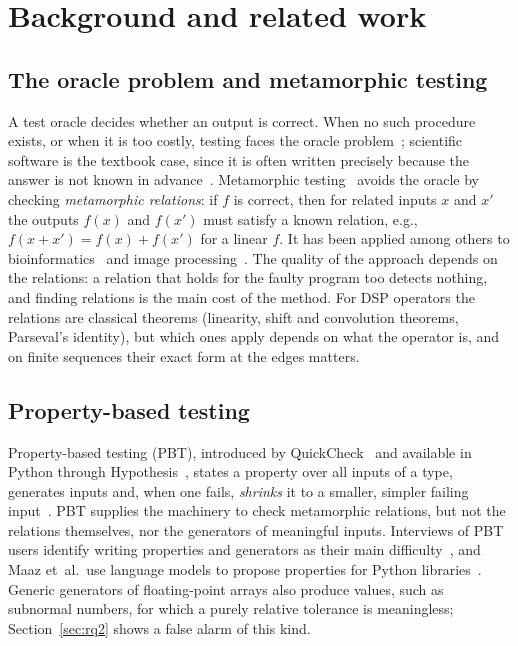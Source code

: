 \documentclass[10pt,conference]{IEEEtran}
\newcommand{\eg}{e.g.,\ }
\begin{document}
\section{Background and related work}
\label{sec:related}

\subsection{The oracle problem and metamorphic testing}
A test oracle decides whether an output is correct. When no such procedure
exists, or when it is too costly, testing faces the oracle
problem~\cite{barr2015oracle}; scientific software is the textbook case, since
it is often written precisely because the answer is not known in
advance~\cite{kanewala2014scientific}. Metamorphic
testing~\cite{chen2018metamorphic,segura2016metamorphic} avoids the oracle by
checking \emph{metamorphic relations}: if $f$ is correct, then for related
inputs $x$ and $x'$ the outputs $f(x)$ and $f(x')$ must satisfy a known
relation, \eg $f(x+x') = f(x)+f(x')$ for a linear $f$. It has been applied
among others to bioinformatics~\cite{chen2009bioinformatics} and image
processing~\cite{jafari2024image}. The quality of the approach depends on the
relations: a relation that holds for the faulty program too detects nothing,
and finding relations is the main cost of the method. For DSP operators the
relations are classical theorems (linearity, shift and convolution theorems,
Parseval's identity), but which ones apply depends on what the operator is, and
on finite sequences their exact form at the edges matters.

\subsection{Property-based testing}
Property-based testing (PBT), introduced by
QuickCheck~\cite{claessen2000quickcheck} and available in Python through
Hypothesis~\cite{maciver2019hypothesis}, states a property over all inputs of a
type, generates inputs and, when one fails, \emph{shrinks} it to a smaller,
simpler failing input~\cite{maciver2020reduction}. PBT supplies the machinery to check
metamorphic relations, but not the relations themselves, nor the generators of
meaningful inputs. Interviews of PBT users identify writing properties and
generators as their main difficulty~\cite{goldstein2024pbt}, and Maaz
et~al.\ use language models to propose properties for Python
libraries~\cite{maaz2025agentic}. Generic generators of floating-point arrays
also produce values, such as subnormal numbers, for which a purely relative
tolerance is meaningless; Section~\ref{sec:rq2} shows a false alarm of this
kind.
\end{document}

